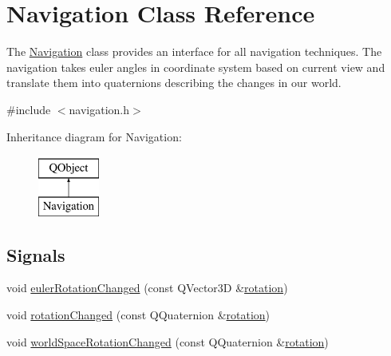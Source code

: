 \hypertarget{class_navigation}{}\section{Navigation Class Reference}
\label{class_navigation}


The \hyperlink{class_navigation}{Navigation} class provides an interface for all navigation techniques.  The navigation takes euler angles in coordinate system based on current view and translate them into quaternions describing the changes in our world.  




{\ttfamily \#include $<$navigation.\+h$>$}

Inheritance diagram for Navigation\+:\begin{figure}[H]
\begin{center}
\leavevmode
\includegraphics[height=2.000000cm]{class_navigation}
\end{center}
\end{figure}
\subsection*{Signals}
\begin{DoxyCompactItemize}
\item 
void \hyperlink{class_navigation_a46da025077023f9c225d3f5dfe870324}{euler\+Rotation\+Changed} (const Q\+Vector3\+D \&\hyperlink{class_navigation_a264e178e874b62aec38c9986a234d044}{rotation})
\item 
void \hyperlink{class_navigation_ac54fe5d8be2858c2988a9f5158d2d58e}{rotation\+Changed} (const Q\+Quaternion \&\hyperlink{class_navigation_a264e178e874b62aec38c9986a234d044}{rotation})
\item 
void \hyperlink{class_navigation_aa8de8f9227de65da000d1ce730821bab}{world\+Space\+Rotation\+Changed} (const Q\+Quaternion \&\hyperlink{class_navigation_a264e178e874b62aec38c9986a234d044}{rotation})
\end{DoxyCompactItemize}
